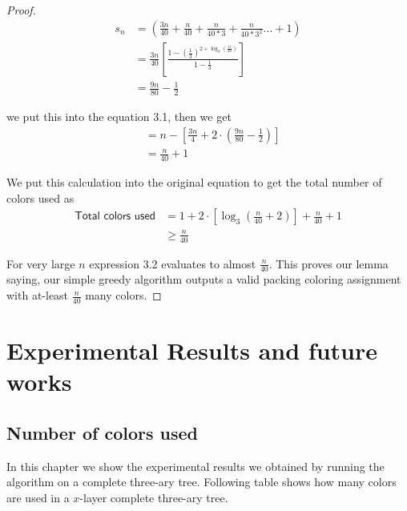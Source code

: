\documentclass{article}
\theoremstyle{remark}
\begin{document}
\begin{proof}
    \begin{align*}
        s_n &= \left( \frac{3n}{40} + \frac{n}{40} + \frac{n}{40 * 3} + \frac{n}{40 * 3^2} \dots + 1 \right)\\
        &= \frac{3n}{40} \left[ \frac{1 - \left(\frac{1}{3}\right)^{2 + \log_3\left(\frac{n}{40}\right)}}{1 - \frac{1}{3}} \right]\\
        &= \frac{9n}{80} - \frac{1}{2}
    \end{align*}

    we put this into the equation 3.1, then we get
    \begin{align*}
        &= n - \left[\frac{3n}{4} + 2 \cdot \left(\frac{9n}{80} - \frac{1}{2}\right)\right]\\
        &= \frac{n}{40} + 1
    \end{align*}

    We put this calculation into the original equation to get the total number of colors used as
    \begin{align}
        \textsf{Total colors used} &= 1 + 2 \cdot \left[\log_3\left(\frac{n}{40} + 2\right)\right] + \frac{n}{40} + 1\\
        &\geq \frac{n}{40}
    \end{align}

    For very large $n$ expression 3.2 evaluates to almost $\frac{n}{40}$. This proves our lemma saying, our simple greedy algorithm outputs a valid packing coloring assignment with at-least $\frac{n}{40}$ many colors.
\end{proof}

\section{Experimental Results and future works}

\subsection{Number of colors used}
In this chapter we show the experimental results we obtained by running the algorithm on a complete three-ary tree. Following table shows how many colors are used in a $x$-layer complete three-ary tree.
\end{document}
